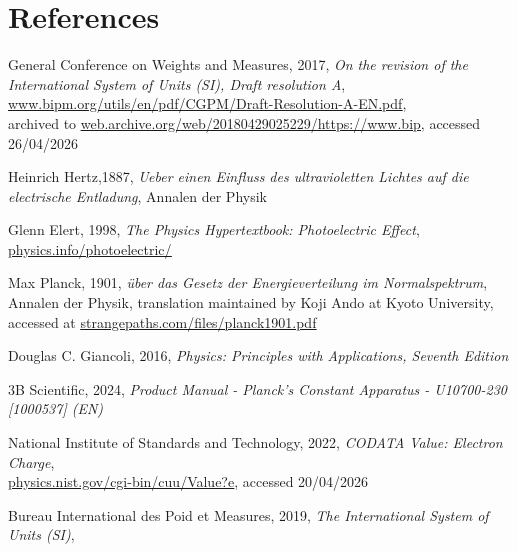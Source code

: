 \documentclass{article}[12pt]
\newcommand{\uhref}[2]{\href{#1}{\underline{#2}}} %
\begin{document}
    \section*{References}
        \begin{enumerate}[label={[\arabic*]}]
            \item \label{reference:plancksConstant} General Conference on Weights and Measures, 2017, \emph{On the revision of the International System of Units (SI), Draft resolution A},
            \uhref{https://web.archive.org/web/20180429025229/https://www.bipm.org/utils/en/pdf/CGPM/Draft-Resolution-A-EN.pdf}{www.bipm.org/utils/en/pdf/CGPM/Draft-Resolution-A-EN.pdf}, \\ archived to \uhref{https://web.archive.org/web/20180429025229/https://www.bipm.org/utils/en/pdf/CGPM/Draft-Resolution-A-EN.pdf}{web.archive.org/web/20180429025229/https://www.bip}, accessed 26/04/2026
            \item \label{reference:uvPaper} Heinrich Hertz,1887, \emph{Ueber einen Einfluss des ultravioletten Lichtes auf die electrische Entladung}, Annalen der Physik
            \item \label{reference:physicsHypertextbook} Glenn Elert, 1998, \emph{The Physics Hypertextbook: Photoelectric Effect}, \uhref{https://physics.info/photoelectric/}{physics.info/photoelectric/}
            \item \label{reference:planckPaper} Max Planck, 1901, \emph{über das Gesetz der Energieverteilung im Normalspektrum}, Annalen der Physik, translation maintained by Koji Ando at Kyoto University, accessed at \uhref{https://strangepaths.com/files/planck1901.pdf}{strangepaths.com/files/planck1901.pdf}
            \item \label{reference:physicsPrinciples} Douglas C. Giancoli, 2016, \emph{Physics: Principles with Applications, Seventh Edition} 
            \item\label{reference:apparatusDocumentation} 3B Scientific, 2024, \emph{Product Manual - Planck’s Constant Apparatus - U10700-230 [1000537] (EN)}
            \item \label{reference:electronCharge} National Institute of Standards and Technology, 2022, \emph{CODATA Value: Electron Charge}, \\
            \uhref{https://physics.nist.gov/cgi-bin/cuu/Value?e}{physics.nist.gov/cgi-bin/cuu/Value?e}, accessed 20/04/2026
            \item \label{reference:speedOfLight} Bureau International des Poid et Measures, 2019, \emph{The International System of Units (SI)}, \\

\end{enumerate}
\end{document}
